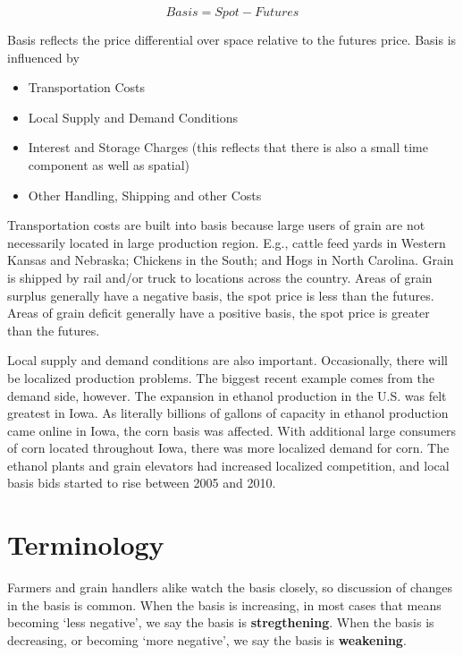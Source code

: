 \documentclass[
  letterpaper,
  DIV=11,
  numbers=noendperiod]{scrreprt}
\providecommand{\tightlist}{%
  \setlength{\itemsep}{0pt}\setlength{\parskip}{0pt}}\usepackage{longtable,booktabs,array}
\begin{document}
\[Basis = Spot - Futures\]

Basis reflects the price differential over space relative to the futures
price. Basis is influenced by

\begin{itemize}
\tightlist
\item
  Transportation Costs
\item
  Local Supply and Demand Conditions
\item
  Interest and Storage Charges (this reflects that there is also a small
  time component as well as spatial)
\item
  Other Handling, Shipping and other Costs
\end{itemize}

Transportation costs are built into basis because large users of grain
are not necessarily located in large production region. E.g., cattle
feed yards in Western Kansas and Nebraska; Chickens in the South; and
Hogs in North Carolina. Grain is shipped by rail and/or truck to
locations across the country. Areas of grain surplus generally have a
negative basis, the spot price is less than the futures. Areas of grain
deficit generally have a positive basis, the spot price is greater than
the futures.

Local supply and demand conditions are also important. Occasionally,
there will be localized production problems. The biggest recent example
comes from the demand side, however. The expansion in ethanol production
in the U.S. was felt greatest in Iowa. As literally billions of gallons
of capacity in ethanol production came online in Iowa, the corn basis
was affected. With additional large consumers of corn located throughout
Iowa, there was more localized demand for corn. The ethanol plants and
grain elevators had increased localized competition, and local basis
bids started to rise between 2005 and 2010.

\section{Terminology}\label{terminology}

Farmers and grain handlers alike watch the basis closely, so discussion
of changes in the basis is common. When the basis is increasing, in most
cases that means becoming `less negative', we say the basis is
\textbf{stregthening}. When the basis is decreasing, or becoming `more
negative', we say the basis is \textbf{weakening}.

\end{document}
